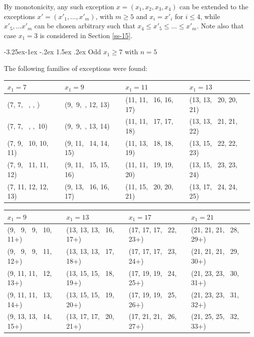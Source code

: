 \documentclass[10pt]{article}
\makeatletter
\renewcommand\subsection{\@startsection{subsection}{2}{\z@}
{-3.25ex\@plus -1ex \@minus -.2ex}
{1.5ex \@plus .2ex}
{\normalfont\normalsize\bfseries\boldmath}}
\theoremstyle{definition}
\makeatother
\begin{document}
\bigskip 

By monotonicity, any such exception  
$x = (x_1, x_2, x_3, x_4)$ 
can be extended to the exceptions $x' = (x'_1, \ldots,  x'_m)$, 
with  $m \geq 5$  and 
$x_i = x'_i$  for $i \leq 4$, while 
$x'_5, \ldots x'_m$  can be chosen arbitrary such that 
$x_4 \leq x'_5 \leq \ldots \leq x'_m$. 
Note also that case  $x_1 = 3$  is considered in Section \ref{ss-15}.

\subsection{Odd $x_1 \geq 7$ with $n=5$}
\label{ss14-5}  

The following families of exceptions were found: 

\bigskip 

\begin{center}
\footnotesize
\begin{tabular}{|l|l|l|l|}
\hline
$x_1 = 7$ & $x_1 = 9$ & $x_1 = 11$ & $x_1 = 13$\\
\hline
(7, 7, \, \;8, \;8, \; 9) & (9,\, 9, \,\; 12, 12, 13) & (11, 11, \, 16, 16, 17) & (13, 13, \, 20, 20, 21)\\
(7, 7, \, \;9, \;9, \,10)& (9,\, 9, \,\; 13, 13, 14) & (11, 11, \, 17, 17, 18) & (13, 13, \, 21, 21, 22)\\
(7, 9, \, 10, 10, 11) & (9, 11, \, 14, 14, 15) & (11, 13, \, 18, 18, 19) &(13, 15, \, 22, 22, 23)\\
(7, 9, \, 11, 11, 12) & (9, 11, \, 15, 15, 16) & (11, 11, \, 19, 19, 20) &(13, 15, \, 23, 23, 24)\\  
(7, 11, 12, 12, 13)& (9, 13, \, 16, 16, 17) & (11, 15, \, 20, 20, 21) &(13, 17, \, 24, 24, 25) \\
\hline
\end{tabular}
\end{center}

\bigskip 
\begin{center}
\footnotesize
\begin{tabular}{|l|l|l|l|}
\hline
$x_1 = 9$ & $x_1 = 13$ & $x_1 = 17$ & $x_1 = 21$\\
\hline
(9, \, 9, \, 9, \, 10, 11+) & (13, 13, 13, \, 16, 17+)  & (17, 17, 17, \, 22, 23+) & (21, 21, 21, \, 28, 29+)\\
(9, \, 9, \, 9, \, 11, 12+) & (13, 13, 13, \, 17, 18+) & (17, 17, 17, \, 23, 24+) & (21, 21, 21, \, 29, 30+)\\
(9, 11, 11, \, 12, 13+) & (13, 15, 15, \, 18, 19+) & (17, 19, 19, \, 24, 25+) & (21, 23, 23, \, 30, 31+)\\
(9, 11, 11, \, 13, 14+) & (13, 15, 15, \, 19, 20+) & (17, 19, 19, \, 25, 26+) & (21, 23, 23, \, 31, 32+)\\
(9, 13, 13, \, 14, 15+) & (13, 17, 17, \, 20, 21+) & (17, 21, 21, \, 26, 27+) & (21, 25, 25, \, 32, 33+)\\
\hline
\end{tabular}
\end{center}
\end{document}
